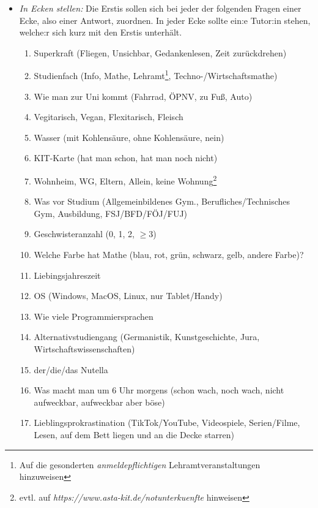 \documentclass[10pt,ngerman]{scrartcl}
\begin{document}
\begin{multicols}{2}
\begin{itemize}
    \item \emph{In Ecken stellen:} Die Erstis sollen sich bei jeder der
        folgenden Fragen einer Ecke, also einer Antwort, zuordnen. In jeder Ecke
        sollte ein:e Tutor:in stehen, welche:r sich kurz mit den Erstis
        unterhält.
        \begin{enumerate}
            \item Superkraft (Fliegen, Unsichbar, Gedankenlesen, Zeit zurückdrehen)
            \item Studienfach (Info, Mathe, Lehramt\footnote{Auf die gesonderten \emph{anmeldepflichtigen} Lehramtveranstaltungen hinzuweisen}, Techno-/Wirtschaftsmathe)
            \item Wie man zur Uni kommt (Fahrrad, ÖPNV, zu Fuß, Auto)
            \item Vegitarisch, Vegan, Flexitarisch, Fleisch
            \item Wasser (mit Kohlensäure, ohne Kohlensäure, nein)
            \item KIT-Karte (hat man schon, hat man noch nicht)
            \item Wohnheim, WG, Eltern, Allein, keine Wohnung\footnote{evtl. auf \emph{https://www.asta-kit.de/notunterkuenfte} hinweisen}
            \item Was vor Studium (Allgemeinbildenes Gym., Berufliches/Technisches Gym, Ausbildung, FSJ/BFD/FÖJ/FUJ)
            \item Geschwisteranzahl (0, 1, 2, $\geq 3$)
            \item Welche Farbe hat Mathe (blau, rot, grün, schwarz, gelb, andere Farbe)?
            \item Liebingsjahreszeit 
            \item OS (Windows, MacOS, Linux, nur Tablet/Handy)
            \item Wie viele Programmiersprachen
            \item Alternativstudiengang (Germanistik, Kunstgeschichte, Jura, Wirtschaftswissenschaften)
            \item der/die/das Nutella
            \item Was macht man um 6 Uhr morgens (schon wach, noch wach, nicht aufweckbar, aufweckbar aber böse)
            \item Lieblingsprokrastination (TikTok/YouTube, Videospiele, Serien/Filme, Lesen, auf dem Bett liegen und an die Decke starren)
        \end{enumerate}


\end{itemize}
\end{multicols}
\end{document}
